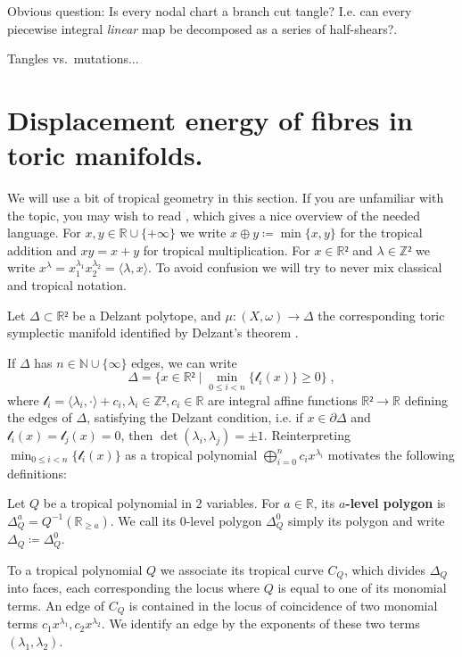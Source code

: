 \documentclass[12pt,a4paper,abstract=true,draft]{scrartcl}
\begin{document}
\begin{remark}
  Obvious question: Is every nodal chart a branch cut tangle? I.e. can every piecewise integral \emph{linear} map be decomposed as a series of half-shears?.
\end{remark}

\begin{remark}
  Tangles vs.\ mutations...
\end{remark}

\section{Displacement energy of fibres in toric manifolds.}

We will use a bit of tropical geometry in this section.
If you are unfamiliar with the topic, you may wish to read \cite[Sections 1-2]{BruSha14}, which gives a nice overview of the needed language.
For $x,y ∈ ℝ ∪ \{+∞\}$ we write $x ⊕ y ≔ \min\{x,y\}$ for the tropical addition and $x y = x+y$ for tropical multiplication.
For $x ∈ ℝ²$ and $λ ∈ ℤ²$ we write $x^{λ} = x_1^{λ_1}  x_2^{λ_2} = ⟨λ,x⟩$.
To avoid confusion we will try to never mix classical and tropical notation.

Let $Δ ⊂ ℝ²$ be a Delzant polytope, and $μ \colon (X,ω) → Δ$ the corresponding toric symplectic manifold identified by Delzant's theorem \cite{Del88}.

If $Δ$ has $n ∈ ℕ ∪ \{∞\}$ edges, we can write
\[Δ = \{x ∈ ℝ² \mid \min_{0 ≤ i < n}\{𝓁_i(x)\} ≥ 0 \} \; ,\]
where $𝓁_i = ⟨λ_i, ·⟩ + c_i, λ_i ∈ ℤ², c_i ∈ ℝ$ are integral affine functions $ℝ² → ℝ$ defining the edges of $Δ$, satisfying the Delzant condition, i.e. if $x ∈ ∂Δ$ and $𝓁_i(x) = 𝓁_j(x) = 0$, then $\det(λ_i,λ_j) = ±1$.
Reinterpreting $\min_{0 ≤ i < n}\{𝓁_i(x)\}$ as a tropical polynomial $⨁_{i=0}^n c_i  x^{λ_i}$ motivates the following definitions:

\begin{definition}
  Let $Q$ be a tropical polynomial in $2$ variables.
  For $a ∈ ℝ$, its \textbf{$a$-level polygon} is $Δ_Q^a = Q^{-1}(ℝ_{≥a})$.
  We call its $0$-level polygon $Δ_Q^0$ simply its polygon and write $Δ_Q ≔ Δ_Q^0$.
\end{definition}

To a tropical polynomial $Q$ we associate its tropical curve $C_Q$, which divides $Δ_Q$ into faces, each corresponding the locus where $Q$ is equal to one of its monomial terms.
An edge of $C_Q$ is contained in the locus of coincidence of two monomial terms $c_1  x^{λ_1}, c_2  x^{λ_2}$.
We identify an edge by the exponents of these two terms $(λ_1,λ_2)$.
\end{document}
